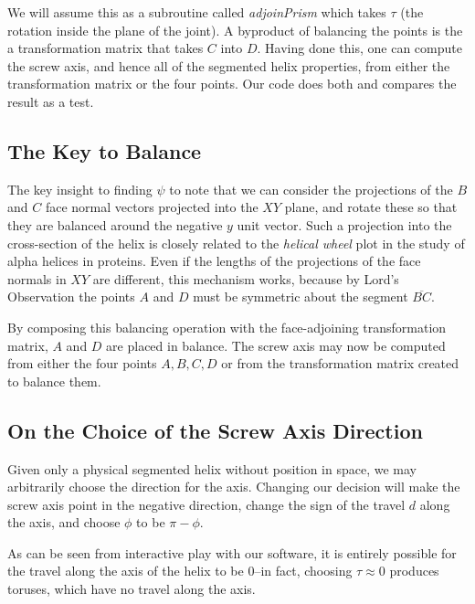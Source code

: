 \documentclass[11pt]{article}
\begin{document}
{We will assume this
as a subroutine called {\em adjoinPrism} which takes $\tau$
(the rotation inside the plane of the joint). A byproduct
of balancing the points is the a transformation matrix
that takes $C$ into $D$. Having done this, one can compute
the screw axis, and hence all of the segmented helix properties,
from either the transformation matrix or the four points. Our
code does both and compares the result as a test.

\subsection{The Key to Balance}

The key insight to finding $\psi$ to note that we
can consider the projections of the $B$ and $C$ face normal vectors
projected into the $XY$ plane, and rotate these so that they
are balanced around the negative $y$ unit vector.
Such a projection into the cross-section of the helix is closely related to
the {\em helical wheel}\cite{wiki:helicalwheel} plot
in the study of alpha helices in proteins.
Even if the lengths of the projections of the face normals in $XY$
are different, this mechanism works, because by Lord's Observation
the points $A$ and $D$ must be symmetric about the segment $\overline{BC}$.

By composing this balancing operation with the face-adjoining transformation
matrix, $A$ and $D$ are placed in balance. The screw axis may now
be computed from either the four points $A,B,C,D$ or from the transformation
matrix created to balance them.

\subsection{On the Choice of the Screw Axis Direction}

Given only a physical segmented helix without position in space, we may arbitrarily choose the
direction for the axis. Changing our decision will make the screw axis point in the negative direction,
change the sign of the travel $d$ along the axis, and choose $\phi$ to be $\pi - \phi$.

As can be seen from interactive play with our software\cite{segmentedhelixinteractive}, it is entirely possible for the travel along
the axis of the helix to be $0$--in fact, choosing $\tau \approx 0$ produces toruses, which have no
travel along the axis.

}
\end{document}
